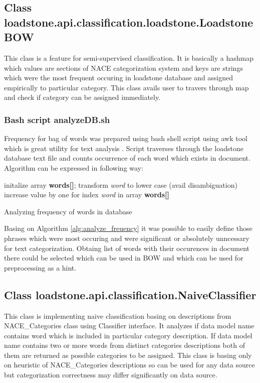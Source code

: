 \subsection{Class loadstone.api.classification.loadstone.LoadstoneBOW}
This class is a feature for semi-supervised classification. It is basically a hashmap which values are sections of NACE categorization system and keys are strings which were the most frequent occuring in loadstone database and assigned empirically to particular category. This class avails user to travers through map and check if category can be assigned immediately. 
\subsubsection{Bash script analyzeDB.sh}
Frequency for bag of words was prepared using bash shell script using awk tool which is great utility for text analysis \cite{21}. Script traverses through the loadstone database text file and counts occurrence of each word which exists in document. Algorithm can be expressed in following way:
\begin{algorithm}[h]
	initalize array \textbf{words[]};
	\newline
	{
		transform \textit{word} to lower case (avail disambiguation)
		\newline
		increase value by one for index \textit{word} in array \textbf{words[]} 
	}
\caption{Analyzing frequency of words in database}\label{alg:analyze_freuency}
\end{algorithm}

Basing on Algorithm \ref{alg:analyze_freuency} it was possible to easily define those phrases which were most occuring and were significant or absolutely unncessary for text categorization. Obtaing list of words with their occurences in document there could be selected which can be used in BOW and which can be used for preprocessing as a hint.

\subsection{Class loadstone.api.classification.NaiveClassifier}
This class is implementing naive classification basing on descriptions from NACE\_Categories class using Classifier interface. It analyzes if data model name contains word which is included in particular category description. If data model name contains two or more words from distinct categories descriptions both of them are returned as possible categories to be assigned. This class is basing only on heuristic of NACE\_Categories descriptions so can be used for any data source but categorization correctness may differ significantly on data source.

